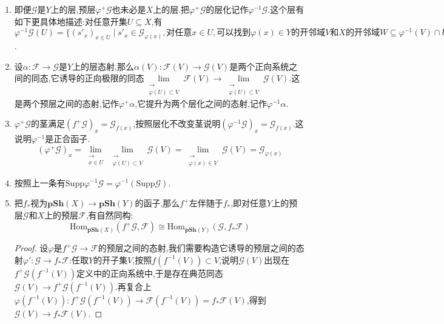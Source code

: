\begin{enumerate}
\begin{enumerate}[(1)]
		\item 即便$\mathscr{G}$是$Y$上的层,预层$\varphi^+\mathscr{G}$也未必是$X$上的层.把$\varphi^+\mathscr{G}$的层化记作$\varphi^{-1}\mathscr{G}$.这个层有如下更具体地描述:对任意开集$U\subseteq X$,有$\varphi^{-1}\mathscr{G}(U)=\{(s'_x)_{x\in U}\mid s'_x\in\mathscr{G}_{\varphi(x)},\text{对任意}x\in U,\text{可以找到}\varphi(x)\in Y\text{的开邻域}V\text{和}X\text{的开邻域}W\subseteq\varphi^{-1}(V)\cap U,\text{以及一个元素}s\in\mathscr{G}(V),\text{使得}\forall z\in W,s'_z=s_{\varphi(z)}\}$.
		\item 设$\alpha:\mathscr{F}\to\mathscr{G}$是$Y$上的层态射,那么$\alpha(V):\mathscr{F}(V)\to\mathscr{G}(V)$是两个正向系统之间的同态,它诱导的正向极限的同态$\lim\limits_{\substack{\rightarrow\\\varphi(U)\subset V}}\mathscr{F}(V)\to\lim\limits_{\substack{\rightarrow\\\varphi(U)\subset V}}\mathscr{G}(V)$.这是两个预层之间的态射,记作$\varphi^+\alpha$,它提升为两个层化之间的态射,记作$\varphi^{-1}\alpha$.
		\item $\varphi^+\mathscr{G}$的茎满足$(f^+\mathscr{G})_x=\mathscr{G}_{f(x)}$,按照层化不改变茎说明$(\varphi^{-1}\mathscr{G})_x=\mathscr{G}_{f(x)}$.这说明$\varphi^{-1}$是正合函子.
		$$(\varphi^+\mathscr{G})_x=\lim\limits_{\substack{\rightarrow\\x\in U}}\lim\limits_{\substack{\rightarrow\\\varphi(U)\subset V}}\mathscr{G}(V)=\lim\limits_{\substack{\rightarrow\\\varphi(x)\in V}}\mathscr{G}(V)=\mathscr{G}_{\varphi(x)}$$
		\item 按照上一条有$\mathrm{Supp}\varphi^{-1}\mathscr{G}=\varphi^{-1}(\mathrm{Supp}\mathscr{G})$.
		\item 把$f_*$视为$\textbf{pSh}(X)\to\textbf{pSh}(Y)$的函子,那么$f^+$左伴随于$f_*$,即对任意$Y$上的预层$\mathscr{G}$和$X$上的预层$\mathscr{F}$,有自然同构:
		$$\mathrm{Hom}_{\textbf{pSh}(X)}(f^+\mathscr{G},\mathscr{F})\cong\mathrm{Hom}_{\textbf{pSh}(Y)}(\mathscr{G},f_*\mathscr{F})$$
		\begin{proof}
			
			设$\varphi$是$f^+\mathscr{G}\to\mathscr{F}$的预层之间的态射,我们需要构造它诱导的预层之间的态射$\varphi':\mathscr{G}\to f_*\mathscr{F}$:任取$Y$的开子集$V$,按照$f(f^{-1}(V))\subset V$,说明$\mathscr{G}(V)$出现在$f^+\mathscr{G}(f^{-1}(V))$定义中的正向系统中,于是存在典范同态$\mathscr{G}(V)\to f^+\mathscr{G}(f^{-1}(V))$.再复合上$\varphi(f^{-1}(V)):f^+\mathscr{G}(f^{-1}(V))\to\mathscr{F}(f^{-1}(V))=f_*\mathscr{F}(V)$,得到$\mathscr{G}(V)\to f_*\mathscr{F}(V)$.
			

\end{proof}
\end{enumerate}
\end{enumerate}
